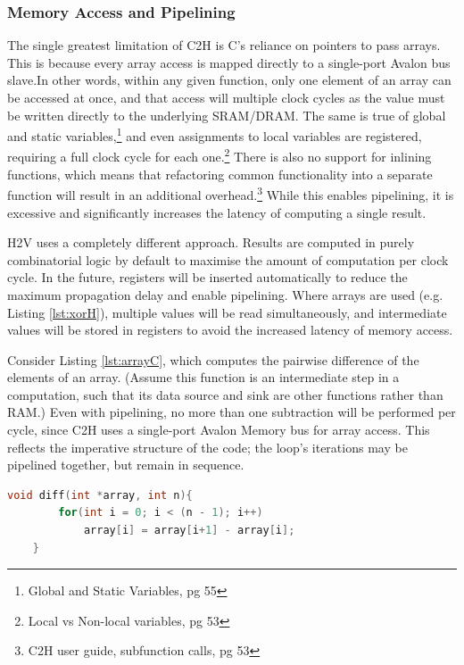 \documentclass[english,onecolumn]{article}
\begin{document}
\subsubsection{Memory Access and Pipelining}
\label{s:pipeline}
The single greatest limitation of C2H is C's reliance on pointers to pass arrays. This is because every array access is mapped directly to a single-port Avalon bus slave.\footnotemark In other words, within any given function, only one element of an array can be accessed at once, and that access will multiple clock cycles as the value must be written directly to the underlying SRAM/DRAM.
The same is true of global and static variables,\footnote{Global and Static Variables, pg 55} and even assignments to local variables are registered, requiring a full clock cycle for each one.\footnote{Local vs Non-local variables, pg 53}
There is also no support for inlining functions, which means that refactoring common functionality into a separate function will result in an additional overhead.\footnote{C2H user guide, subfunction calls, pg 53}
While this enables pipelining, it is excessive and significantly increases the latency of computing a single result.

H2V uses a completely different approach. Results are computed in purely combinatorial logic by default to maximise the amount of computation per clock cycle. In the future, registers will be inserted automatically to reduce the maximum propagation delay and enable pipelining. Where arrays are used (e.g. Listing \ref{lst:xorH}), multiple values will be read simultaneously, and intermediate values will be stored in registers to avoid the increased latency of memory access.

Consider Listing \ref{lst:arrayC}, which computes the pairwise difference of the elements of an array.
(Assume this function is an intermediate step in a computation, such that its data source and sink are other functions rather than RAM.)
Even with pipelining, no more than one subtraction will be performed per cycle, since C2H uses a single-port Avalon Memory bus for array access. This reflects the imperative structure of the code; the loop's iterations may be pipelined together, but remain in sequence.

\begin{lstlisting}[language=C, caption={Array Bottleneck Example (C).}, label={lst:arrayC}]
    void diff(int *array, int n){
        for(int i = 0; i < (n - 1); i++)
            array[i] = array[i+1] - array[i];
    }
\end{lstlisting}
\end{document}
